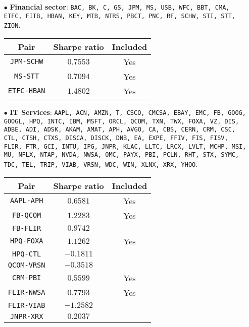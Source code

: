 \documentclass{paper}
\begin{document}
\begin{itemize}

\item[$\bullet$] \textbf{Financial sector}: \texttt{BAC, BK, C, GS, JPM, MS, USB, WFC, BBT, CMA, ETFC, FITB, HBAN, KEY, MTB, NTRS, PBCT, PNC, RF, SCHW, STI, STT, ZION}.
\begin{center}
\begin{tabular}{| c | c | c | }
\hline
\textbf{Pair} & \textbf{Sharpe ratio}  & \textbf{Included} \\ \hline
\texttt{JPM-SCHW} & $0.7553$ & Yes \\ \hline
\texttt{MS-STT} & $0.7094$ & Yes \\ \hline
\texttt{ETFC-HBAN} & $1.4802$ & Yes  \\ \hline
\end{tabular}
\end{center}
\item[$\bullet$] \textbf{IT Services}: \texttt{AAPL, ACN, AMZN, T, CSCO, 
CMCSA, EBAY, EMC, FB, GOOG, GOOGL, HPQ, INTC, IBM, MSFT, ORCL, QCOM, 
TXN, TWX, FOXA, VZ, DIS, ADBE, ADI, ADSK, AKAM, AMAT, APH, AVGO, CA, 
CBS, CERN, CRM, CSC, CTL, CTSH, CTXS, DISCA, DISCK, DNB, EA, EXPE, FFIV, FIS, 
FISV, FLIR, FTR, GCI, INTU, IPG, JNPR, KLAC, LLTC, LRCX, LVLT, MCHP, MSI, MU,
NFLX, NTAP, NVDA, NWSA, OMC, PAYX, PBI, PCLN, RHT, STX, SYMC, TDC, TEL, 
TRIP, VIAB, VRSN, WDC, WIN, XLNX, XRX, YHOO}.
\begin{center}
\begin{tabular}{| c | c | c | }
\hline
\textbf{Pair} & \textbf{Sharpe ratio}  & \textbf{Included} \\ \hline
\texttt{AAPL-APH} & $0.6581$ & Yes  \\ \hline
\texttt{FB-QCOM} & $1.2283$ & Yes  \\ \hline
\texttt{FB-FLIR} & $0.9742$ &  \\ \hline
\texttt{HPQ-FOXA} & $1.1262$ & Yes  \\ \hline
\texttt{HPQ-CTL} & $-0.1811$ &  \\ \hline
\texttt{QCOM-VRSN} & $-0.3518$ &  \\ \hline
\texttt{CRM-PBI} & $0.5599$ & Yes \\ \hline
\texttt{FLIR-NWSA} & $0.7793$ & Yes \\ \hline
\texttt{FLIR-VIAB} & $-1.2582$ &  \\ \hline
\texttt{JNPR-XRX} & $0.2037$ &   \\ \hline
\end{tabular}
\end{center}



\end{itemize}
\end{document}
